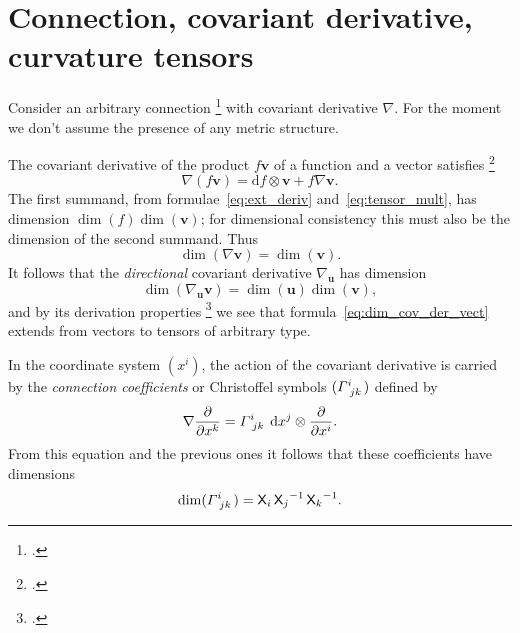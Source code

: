 \documentclass[a4paper,12pt,onecolumn,oneside,article,british]{memoir}
\newcommand*{\citep}{\footcites}
\newcommand*{\de}{\partial}%
\newcommand*{\di}{\mathrm{d}}%
\newcommand*{\sect}{\S}%
\newcommand*{\Xx}{\textsf{X}}
\newcommand*{\yv}{\bm{v}}
\newcommand*{\yu}{\bm{u}}
\renewcommand*{\i}{\indices}
\newcommand*{\dex}[1][i]{\frac{\de}{\de x^{#1}}}
\newcommand*{\dix}[1][i]{\di x^{#1}}
\newcommand*{\nab}{\nabla}
\newcommand*{\yGa}{\varGamma}
\begin{document}
\section{Connection, covariant derivative, curvature tensors}
\label{sec:connection}

Consider an arbitrary connection
\citep[\sect~V.B]{choquetbruhatetal1977_r1996} with covariant derivative
$\nab$. For the moment we don't assume the presence of any metric
structure.

The covariant derivative of the product $f\yv$ of a function and a vector
satisfies \citep[\sect~V.B.1]{choquetbruhatetal1977_r1996}
\begin{equation}
  \label{eq:basic_property_covder}
  \nab(f\yv) = \di f \otimes \yv + f\nab\yv.
\end{equation}
The first summand, from formulae~\eqref{eq:ext_deriv}
and~\eqref{eq:tensor_mult}, has dimension $\dim(f)\dim(\yv)$; for
dimensional consistency this must also be the dimension of the second
summand. Thus
\begin{equation}
  \label{eq:dim_cov_der_vect}
  \dim(\nab\yv) = \dim(\yv).
\end{equation}
It follows that the \emph{directional} covariant derivative $\nab_{\yu}$
has dimension
\begin{equation}
  \label{eq:dim_dircov_der_vect}
  \dim(\nab_{\yu}\yv) = \dim(\yu)\dim(\yv),
\end{equation}
and by its derivation properties \citep[\sect~V.B.1
p.~303]{choquetbruhatetal1977_r1996} we see that
formula~\eqref{eq:dim_cov_der_vect} extends from vectors to 
tensors of arbitrary type.

\medskip

In the coordinate system $(x^{i})$, the action of the covariant derivative
is carried by the \emph{connection coefficients} or Christoffel symbols
$(\yGa\i{^{i}_{jk}})$ defined by
\begin{equation}
  \label{eq:christoffel}
  \nab\dex[k] = \yGa\i{^{i}_{jk}}\; \dix[j]\otimes\dex[i].
\end{equation}
From this equation and the previous ones it follows that these coefficients
have dimensions
\begin{equation}
  \label{eq:dim_christoffel}
  \dim(\yGa\i{^{i}_{jk}}) = \Xx_{i}\, {\Xx_{j}}^{-1}\,{\Xx_{k}}^{-1}.
\end{equation}

\medskip
\end{document}
